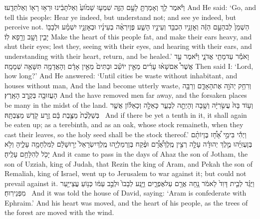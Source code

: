 {וַיֹּ֕אמֶר לֵ֥ךְ וְאָמַרְתָּ֖ לָעָ֣ם הַזֶּ֑ה שִׁמְע֤וּ שָׁמ֙וֹעַ֙ וְאַל\maqqaf תָּבִ֔ינוּ וּרְא֥וּ רָא֖וֹ וְאַל\maqqaf תֵּדָֽעוּ׃}
{And He said: ‘Go, and tell this people: Hear ye indeed, but understand not; and see ye indeed, but perceive not.}
{הַשְׁמֵן֙ לֵב\maqqaf הָעָ֣ם הַזֶּ֔ה וְאׇזְנָ֥יו הַכְבֵּ֖ד וְעֵינָ֣יו הָשַׁ֑ע פֶּן\maqqaf יִרְאֶ֨ה בְעֵינָ֜יו וּבְאׇזְנָ֣יו יִשְׁמָ֗ע וּלְבָב֥וֹ יָבִ֛ין וָשָׁ֖ב וְרָ֥פָא לֽוֹ׃}
{Make the heart of this people fat, and make their ears heavy, and shut their eyes; lest they, seeing with their eyes, and hearing with their ears, and understanding with their heart, return, and be healed.’}
{וָאֹמַ֕ר עַד\maqqaf מָתַ֖י אֲדֹנָ֑י וַיֹּ֡אמֶר עַ֣ד אֲשֶׁר֩ אִם\maqqaf שָׁא֨וּ עָרִ֜ים מֵאֵ֣ין יוֹשֵׁ֗ב וּבָתִּים֙ מֵאֵ֣ין אָדָ֔ם וְהָאֲדָמָ֖ה תִּשָּׁאֶ֥ה שְׁמָמָֽה׃}
{Then said I: ‘Lord, how long?’ And He answered: ‘Until cities be waste without inhabitant, and houses without man, And the land become utterly waste,}
{וְרִחַ֥ק יְהֹוָ֖ה אֶת\maqqaf הָאָדָ֑ם וְרַבָּ֥ה הָעֲזוּבָ֖ה בְּקֶ֥רֶב הָאָֽרֶץ׃}
{And the \lord\space have removed men far away, and the forsaken places be many in the midst of the land.}
{וְע֥וֹד בָּהּ֙ עֲשִׂ֣רִיָּ֔ה וְשָׁ֖בָה וְהָיְתָ֣ה לְבָעֵ֑ר כָּאֵלָ֣ה וְכָאַלּ֗וֹן אֲשֶׁ֤ר בְּשַׁלֶּ֙כֶת֙ מַצֶּ֣בֶת בָּ֔ם זֶ֥רַע קֹ֖דֶשׁ מַצַּבְתָּֽהּ׃ \petucha }
{And if there be yet a tenth in it, it shall again be eaten up; as a terebinth, and as an oak, whose stock remaineth, when they cast their leaves, so the holy seed shall be the stock thereof.’}
\newperek
{}
{וַיְהִ֡י בִּימֵ֣י אָ֠חָ֠ז בֶּן\maqqaf יוֹתָ֨ם בֶּן\maqqaf עֻזִּיָּ֜הוּ מֶ֣לֶךְ יְהוּדָ֗ה עָלָ֣ה רְצִ֣ין מֶֽלֶךְ\maqqaf אֲ֠רָ֠ם וּפֶ֨קַח בֶּן\maqqaf רְמַלְיָ֤הוּ מֶֽלֶךְ\maqqaf יִשְׂרָאֵל֙ יְר֣וּשָׁלַ֔͏ִם לַמִּלְחָמָ֖ה עָלֶ֑יהָ וְלֹ֥א יָכֹ֖ל לְהִלָּחֵ֥ם עָלֶֽיהָ׃}
{And it came to pass in the days of Ahaz the son of Jotham, the son of Uzziah, king of Judah, that Rezin the king of Aram, and Pekah the son of Remaliah, king of Israel, went up to Jerusalem to war against it; but could not prevail against it.}
{וַיֻּגַּ֗ד לְבֵ֤ית דָּוִד֙ לֵאמֹ֔ר נָ֥חָה אֲרָ֖ם עַל\maqqaf אֶפְרָ֑יִם וַיָּ֤נַע לְבָבוֹ֙ וּלְבַ֣ב עַמּ֔וֹ כְּנ֥וֹעַ עֲצֵי\maqqaf יַ֖עַר מִפְּנֵי\maqqaf רֽוּחַ׃ \setuma }
{And it was told the house of David, saying: ‘Aram is confederate with Ephraim.’ And his heart was moved, and the heart of his people, as the trees of the forest are moved with the wind.}
